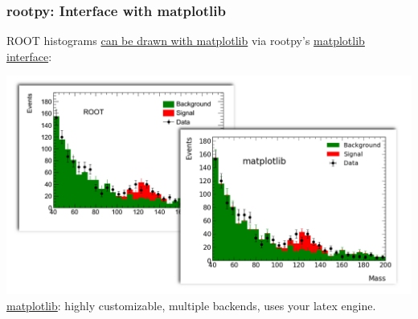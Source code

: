 \documentclass[10pt,professionalfonts,serif,usenames,dvipsnames,svgnames,table]{beamer}
\begin{document}
\begin{frame}
    \frametitle{rootpy: Interface with matplotlib}
    ROOT histograms
    \href{https://github.com/rootpy/rootpy/blob/master/examples/plotting/plot_matplotlib_hist.py}{
    can be drawn with matplotlib} via rootpy's
    \href{https://github.com/rootpy/rootpy/blob/master/rootpy/plotting/root2matplotlib.py}{
    matplotlib interface}:
    \begin{center}
    \includegraphics[width=.9\textwidth]{figs/examples/matplotlib_example.png}\\
    \href{http://matplotlib.org/gallery.html}{matplotlib}: highly customizable,
    multiple backends, uses your latex engine.
\end{center}
\end{frame}
\end{document}
